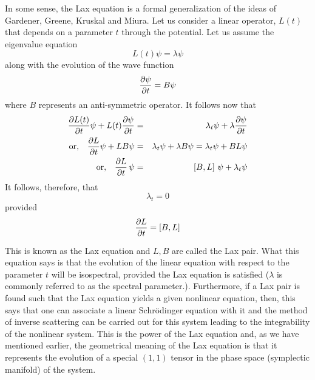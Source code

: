 \documentclass[a4paper,11pt]{article}
\begin{document}

In some sense, the Lax equation is a formal generalization of the
ideas of Gardener, Greene, Kruskal and Miura. Let us consider a linear
operator, $L(t)$ that depends on a parameter $t$ through the
potential. Let us assume the eigenvalue equation
\begin{equation}
L (t) \psi = \lambda \psi
\end{equation}
along with the evolution of the wave function
\begin{equation}
{\partial \psi\over \partial t} = B \psi
\end{equation}
where $B$ represents an anti-symmetric operator. It follows now that
\begin{eqnarray}
{\partial L(t)\over \partial t} \psi + L(t) {\partial \psi\over
\partial t} & = & \lambda_{t} \psi + \lambda {\partial \psi\over
\partial t}\nonumber\\
{\rm or,}\quad {\partial L\over \partial t} \psi + L B \psi & = &
\lambda_{t} \psi + \lambda B \psi = \lambda_{t} \psi + B L
\psi\nonumber\\
{\rm or,}\quad {\partial L\over \partial t}\,\psi & = & \left[B ,
L\right]\,\psi + \lambda_{t} \psi
\end{eqnarray}
It follows, therefore, that
\begin{equation}
\lambda_{t} = 0
\end{equation}
provided
\begin{equation}
{\partial L\over \partial t} = \left[ B , L \right]
\end{equation}

This is known as the Lax equation and $L, B$ are called the Lax
pair. What this equation says is that the evolution of the linear
equation with respect to the parameter $t$ will be isospectral,
provided the Lax equation is satisfied ($\lambda$ is commonly referred
to as the spectral parameter.). Furthermore, if a Lax pair is
found such that the Lax equation yields a given nonlinear equation,
then, this says that one can associate a linear Schr\"{o}dinger
equation with it and the method of inverse scattering can be carried
out for this system leading to the integrability of the nonlinear
system. This is the power of the Lax equation and, as we have
mentioned earlier, the geometrical meaning of the Lax equation is that
it represents the evolution of a special $(1,1)$ tensor in the
phase space (symplectic manifold) of the system.
\end{document}
